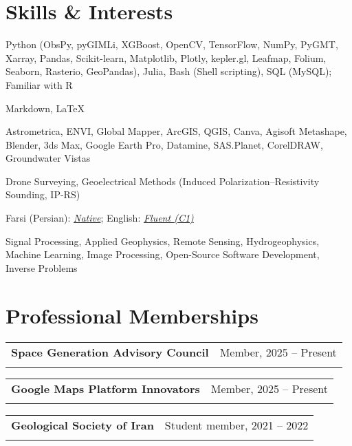 \documentclass[letterpaper,11pt]{article}
\makeatletter
\newcommand{\ressubheading}[4]{%
	\begin{tabular*}{\textwidth}{l@{\cftdotfill{\cftsecdotsep}\extracolsep{\fill}}r}
		\textbf{#1} & #2 \\
		\textit{#3} & \textit{#4} \\
	\end{tabular*}\vspace{-8pt}
}
\makeatother
\begin{document}
	\section{Skills \& Interests}
	\begin{description}[itemsep=0pt]
		
		\item[Programming Languages:] 
		Python (ObsPy, pyGIMLi, XGBoost, OpenCV, TensorFlow, NumPy, PyGMT, Xarray, Pandas, Scikit-learn, Matplotlib, Plotly, kepler.gl, Leafmap, Folium, Seaborn, Rasterio, GeoPandas), Julia, Bash (Shell scripting), SQL (MySQL); Familiar with R
		
		\item[Markup Languages:] 
		Markdown, \LaTeX
		
		\item[Softwares:] 
		Astrometrica, ENVI, Global Mapper, ArcGIS, QGIS, Canva, Agisoft Metashape, Blender, 3ds Max, Google Earth Pro, Datamine, SAS.Planet, CorelDRAW, Groundwater Vistas
		
		\item[Field Techniques:] 
		Drone Surveying, Geoelectrical Methods (Induced Polarization–Resistivity Sounding, IP-RS)
		
		\item[Languages:] 
		Farsi (Persian): \textit{\underline{Native}}; English: \textit{\underline{Fluent (C1)}}
		
		\item[Research Interests:] 
		Signal Processing, Applied Geophysics, Remote Sensing, Hydrogeophysics, Machine Learning, Image Processing, Open-Source Software Development, Inverse Problems
		
	\end{description}
	\vspace{-2.0em} 
	\section{Professional Memberships}
\vspace{-0.5em} 
\ressubheading{Space Generation Advisory Council}{Member, 2025 – Present}{}{}
\vspace{-0.2em} 
\vspace{-0.5em} 
\ressubheading{Google Maps Platform Innovators}{Member, 2025 – Present}{}{}
\vspace{-0.2em} 
\vspace{-0.5em} 
\ressubheading{Geological Society of Iran}{Student member, 2021 – 2022}{}{}
\vspace{2em} 
\end{document}
